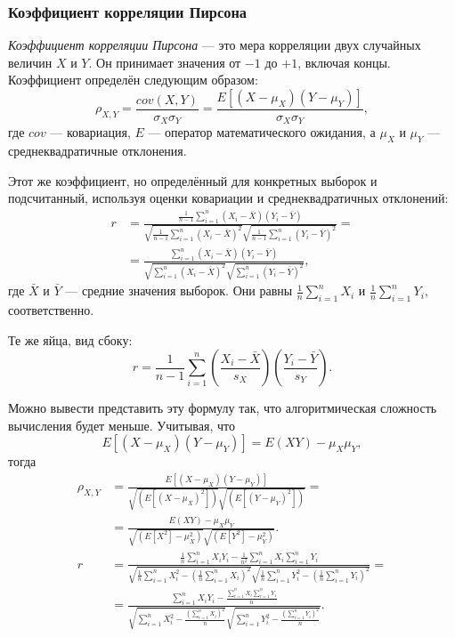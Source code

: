 \subsubsection{Коэффициент корреляции Пирсона}
\emph{Коэффициент корреляции Пирсона} — это мера корреляции двух случайных величин \(X\) и \(Y\). Он принимает значения от \(-1\) до \(+1\), включая концы. Коэффициент определён следующим образом:
\[
\rho_{X, Y} = \frac{cov(X, Y)}{\sigma_X \sigma_Y} = \frac{E[(X - \mu_X)(Y - \mu_Y)]}{\sigma_X \sigma_Y},
\]
где \(cov\) — ковариация, \(E\) — оператор математического ожидания, а \(\mu_X\) и \(\mu_Y\) — среднеквадратичные отклонения.

Этот же коэффициент, но определённый для конкретных выборок и подсчитанный, используя оценки ковариации и среднеквадратичных отклонений:
\begin{align*}
r &= \frac{\frac{1}{n - 1} \sum_{i = 1}^n (X_i - \bar{X})(Y_i - \bar{Y})}{\sqrt{\frac{1}{n - 1} \sum_{i = 1}^n (X_i - \bar{X})^2} \sqrt{\frac{1}{n - 1} \sum_{i = 1}^n (Y_i - \bar{Y})^2}} = \\
  &= \frac{\sum_{i = 1}^n (X_i - \bar{X})(Y_i - \bar{Y})}{\sqrt{\sum_{i = 1}^n (X_i - \bar{X})^2} \sqrt{\sum_{i = 1}^n (Y_i - \bar{Y})^2}},
\end{align*}
где \(\bar{X}\) и \(\bar{Y}\) — средние значения выборок. Они равны \(\frac{1}{n} \sum_{i = 1}^n X_i\) и \(\frac{1}{n} \sum_{i = 1}^n Y_i\), соответственно.

Те же яйца, вид сбоку:
\[
r = \frac{1}{n - 1} \sum_{i = 1}^n \left( \frac{X_i - \bar{X}}{s_X} \right) \left( \frac{Y_i - \bar{Y}}{s_Y} \right).
\]

Можно вывести представить эту формулу так, что алгоритмическая сложность вычисления будет меньше. Учитывая, что
\[
E[(X - \mu_X)(Y - \mu_Y)] = E(XY) - \mu_X \mu_Y,
\]
тогда
\begin{align*}
\rho_{X, Y} &= \frac{E[(X - \mu_X)(Y - \mu_Y)]}{\sqrt{(E[(X - \mu_X)^2])} \sqrt{(E[(Y - \mu_Y)^2])}} = \\
  &= \frac{E(XY) - \mu_X \mu_Y}{\sqrt{(E[X^2] - \mu_X^2)} \sqrt{(E[Y^2] - \mu_Y^2)}}. \\
r &= \frac{\frac{1}{n} \sum_{i = 1}^n{X_i Y_i} - \frac{1}{n^2} \sum_{i = 1}^n{X_i} \sum_{i = 1}^n{Y_i}}{\sqrt{\frac{1}{n}\sum_{i = 1}^n{X_i^2} - (\frac{1}{n}\sum_{i = 1}^n{X_i})^2} \sqrt{\frac{1}{n}\sum_{i = 1}^n{Y_i^2} - (\frac{1}{n}\sum_{i = 1}^n{Y_i})^2}} = \\
  &= \frac{\sum_{i = 1}^n{X_i Y_i} - \frac{\sum_{i = 1}^n{X_i} \sum_{i = 1}^n{Y_i}}{n}}{\sqrt{\sum_{i = 1}^n{X_i^2} - \frac{\left(\sum_{i = 1}^n{X_i}\right)^2}{n}} \sqrt{\sum_{i = 1}^n{Y_i^2} - \frac{\left(\sum_{i = 1}^n{Y_i}\right)^2}{n}}}.
\end{align*}

